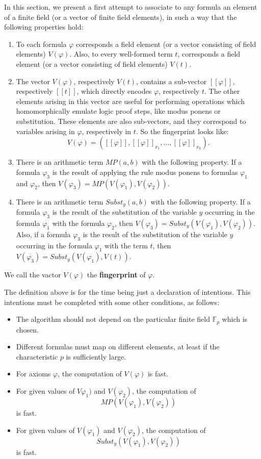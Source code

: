 \documentclass{article}
\theoremstyle{plain}
\theoremstyle{definition}
\begin{document}
In this section, we present a first attempt to associate to any formula an element of a finite field  (or a vector of finite field elements), in such a way that the following properties hold:
\begin{enumerate}
    \item To each formula $\varphi$ corresponds a field element (or a vector consisting of field elements) $V(\varphi)$. Also, to every well-formed term $t$, corresponds a field element (or a vector consisting of field elements) $V(t)$. 
    \item The vector $V(\varphi)$, respectively $V(t)$, contains a sub-vector $[[\varphi]]$, respectively $[[t]]$, which directly encodes $\varphi$, respectively $t$. The other elements arising in this vector are useful for performing operations which homomorphically emulate logic proof steps, like modus ponens or substitution. These elements are also sub-vectors, and they correspond to variables arising in $\varphi$, respectively in $t$. So the fingerprint looks like:
    $$V(\varphi) = ([[\varphi]], [[\varphi]]_{x_1}, \dots , [[\varphi]]_{x_k}).$$
    \item There is an arithmetic term $MP(a, b)$ with the following property. If a formula $\varphi_3$ is the result of applying the rule modus ponens to formulas $\varphi_1$ and $\varphi_2$, then $V(\varphi_3) = MP(V(\varphi_1), V(\varphi_2))$. 
    \item There is an arithmetic term $Subst_y(a, b)$ with the following property. If a formula $\varphi_3$ is the result of the substitution of the variable $y$ occurring in the formula $\varphi_1$ with the formula $\varphi_2$, then $V(\varphi_3) = Subst_y(V(\varphi_1), V(\varphi_2))$. Also, if a formula $\varphi_3$ is the result of the substitution of the variable $y$ occurring in the formula $\varphi_1$ with the term $t$, then $V(\varphi_3) = Subst_y(V(\varphi_1), V(t))$.
\end{enumerate} 

We call the vactor $V(\varphi)$ the {\bf fingerprint} of $\varphi$. 

The definition above is for the time being just a declaration of intentions. This intentions must be completed with some other conditions, as follows:

\begin{itemize}
 \item The algorithm should not depend on the particular finite field $\mathbb F_p$ which is chosen.

 \item Different formulas must map on different elements, at least if the characteristic $p$ is sufficiently large. 

 \item  For axioms $\varphi$, the computation of $V(\varphi)$ is fast.

 \item  For given values of $V\varphi_1)$ and $V(\varphi_2)$, the computation of $$MP(V(\varphi_1), V(\varphi_2))$$ is fast.

 \item  For given values of $V(\varphi_1)$ and $V(\varphi_2)$, the computation of $$Subst_y(V(\varphi_1), V(\varphi_2))$$ is fast. 
\end{itemize}
\end{document}
